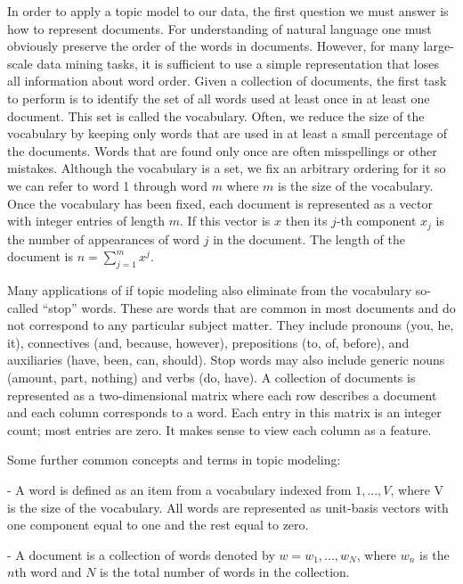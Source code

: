 \documentclass[12pt]{report}
\begin{document}
In order to apply a topic model to our data, the first question we must answer is how to represent documents. For understanding of natural language one must obviously preserve the order of the words in documents. However, for many large-scale data mining tasks, it is sufficient to use a simple representation that loses all information about word order. Given a collection of documents, the first task to perform is to identify the set of all words used at least once in at least one document. This set is called the vocabulary. Often, we reduce the size of the vocabulary by keeping only words that are used in at least a small percentage of the documents. Words that are found only once are often misspellings or other mistakes. Although the vocabulary is a set, we fix an arbitrary ordering for it so we can refer to word 1 through word $m$ where $m$ is the size of the vocabulary. Once the vocabulary has been fixed, each document is represented as a vector with integer entries of length $m$. If this vector is $x$ then its $j$-th component $x_j$ is the number of appearances of word $j$ in the document. The length of the document is $n=\sum\limits_{j=1}^m x^j$.\par

\vspace{3mm}

Many applications of if topic modeling also eliminate from the vocabulary so-called “stop” words. These are words that are common in most documents and do not correspond to any particular subject matter. They include pronouns (you, he, it), connectives (and, because, however), prepositions (to, of, before), and auxiliaries (have, been, can, should).  Stop words may also include generic nouns (amount, part, nothing) and verbs (do, have). A collection of documents is represented as a two-dimensional matrix where each row describes a document and each column corresponds to a word. Each entry in this matrix is an integer count; most entries are zero. It makes sense to view each column as a feature.\par
 
\vspace{3mm}

Some further common concepts and terms in topic modeling:

- A word is defined as an item from a vocabulary indexed from ${1, ..., V}$, where V is the size of the vocabulary. All words are represented as unit-basis vectors with one component equal to one and the rest equal to zero.

- A document is a collection of words denoted by $w = {w_1, ..., w_N}$, where $w_n$ is the $n$th word and $N$ is the total number of words in the collection.
\end{document}
